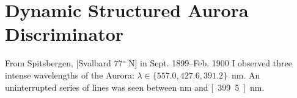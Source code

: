 \chapter{Dynamic Structured Aurora Discriminator}
\label{chapter:discrim}
\thispagestyle{myheadings}

\graphicspath{{Discrimination/}}

\epigraph{From Spitsbergen, [Svalbard 77$^\circ$ N] in Sept. 1899--Feb. 1900 I observed three intense wavelengths of the Aurora: $\lambda \in \{557.0, 427.6, 391.2\}$~nm. An uninterrupted series of lines was seen between \unit[490]{nm} and \unit[399.5]{nm}.}{\citep{sykora1901}}






